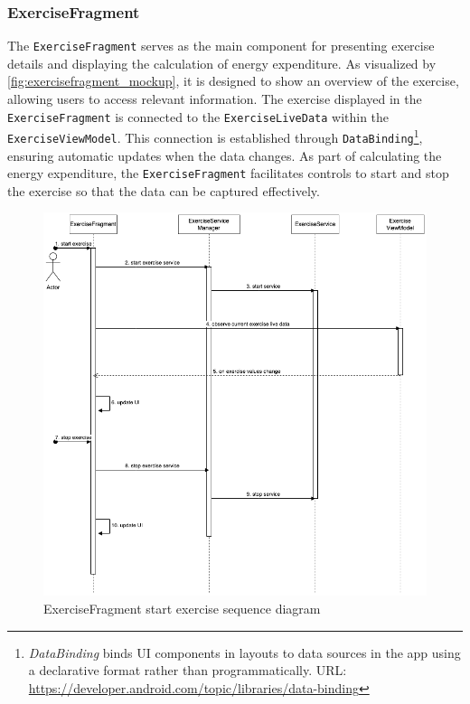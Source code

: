 \subsubsection{ExerciseFragment}
\label{chap:exercise_design}
The \texttt{ExerciseFragment} serves as the main component for presenting exercise details and displaying the calculation of energy expenditure. 
As visualized by \autoref{fig:exercisefragment_mockup}, it is designed to show an overview of the exercise, allowing users to access relevant information.
The exercise displayed in the \texttt{ExerciseFragment} is connected to the \texttt{ExerciseLiveData} within the \texttt{ExerciseViewModel}. This connection is established through \texttt{DataBinding}\footnote{\emph{DataBinding} binds UI components in layouts to data sources in the app using a declarative format rather than programmatically. URL: \url{https://developer.android.com/topic/libraries/data-binding}}, ensuring automatic updates when the data changes. 
As part of calculating the energy expenditure, the \texttt{ExerciseFragment} facilitates controls to start and stop the exercise so that the data can be captured effectively.
\newline
\begin{figure}[H]
    \centering
    \includegraphics[width=1\textwidth]{diagrams/start-ex-frag.drawio.png}
    \caption{ExerciseFragment start exercise sequence diagram}
    \label{fig:exercisefragment_start_diagram}
\end{figure}
